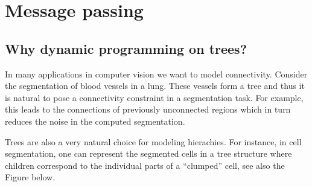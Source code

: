 \chapter{Message passing}%
\label{chap:07}

\section{Why dynamic programming on trees?}
In many applications in computer vision we want to model
connectivity. Consider the segmentation of blood vessels in a
lung. These vessels form a tree and thus it is natural to pose a
connectivity constraint in a segmentation task. For example, this
leads to the connections of previously unconnected regions which in
turn reduces the noise in the computed segmentation.

Trees are also a very natural choice for modeling hierachies. For
instance, in cell segmentation, one can represent the segmented cells
in a tree structure where children correspond to the individual parts
of a ``clumped'' cell, see also the Figure below.

